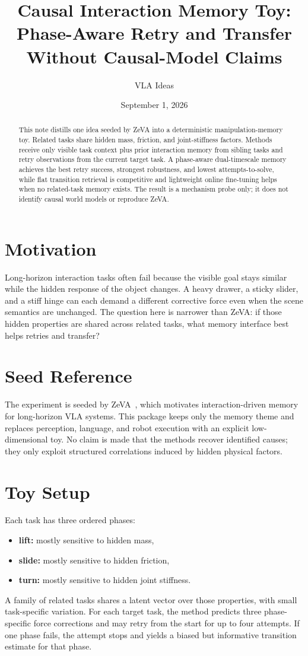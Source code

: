\documentclass[11pt]{article}
\title{Causal Interaction Memory Toy:\\Phase-Aware Retry and Transfer Without Causal-Model Claims}
\author{VLA Ideas}
\date{September 1, 2026}
\begin{document}
\maketitle

\begin{abstract}
This note distills one idea seeded by ZeVA into a deterministic manipulation-memory toy. Related tasks share hidden mass, friction, and joint-stiffness factors. Methods receive only visible task context plus prior interaction memory from sibling tasks and retry observations from the current target task. A phase-aware dual-timescale memory achieves the best retry success, strongest robustness, and lowest attempts-to-solve, while flat transition retrieval is competitive and lightweight online fine-tuning helps when no related-task memory exists. The result is a mechanism probe only; it does not identify causal world models or reproduce ZeVA.
\end{abstract}

\section{Motivation}
Long-horizon interaction tasks often fail because the visible goal stays similar while the hidden response of the object changes. A heavy drawer, a sticky slider, and a stiff hinge can each demand a different corrective force even when the scene semantics are unchanged. The question here is narrower than ZeVA: if those hidden properties are shared across related tasks, what memory interface best helps retries and transfer?

\section{Seed Reference}
The experiment is seeded by ZeVA~\cite{zeva}, which motivates interaction-driven memory for long-horizon VLA systems. This package keeps only the memory theme and replaces perception, language, and robot execution with an explicit low-dimensional toy. No claim is made that the methods recover identified causes; they only exploit structured correlations induced by hidden physical factors.

\section{Toy Setup}
Each task has three ordered phases:
\begin{itemize}[leftmargin=1.5em]
  \item \textbf{lift:} mostly sensitive to hidden mass,
  \item \textbf{slide:} mostly sensitive to hidden friction,
  \item \textbf{turn:} mostly sensitive to hidden joint stiffness.
\end{itemize}
A family of related tasks shares a latent vector over those properties, with small task-specific variation. For each target task, the method predicts three phase-specific force corrections and may retry from the start for up to four attempts. If one phase fails, the attempt stops and yields a biased but informative transition estimate for that phase.
\end{document}
